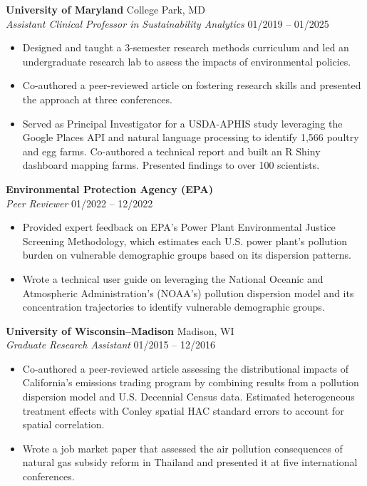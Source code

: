 \documentclass[11pt,letterpaper]{article}
\newcommand{\entry}[4]{%
  \textbf{#1} \hfill #2 \\
  \textit{#3} \hfill #4 \par\vspace{1pt}}
\begin{document}
\vspace{10pt}
\entry{University of Maryland}{College Park, MD}{Assistant Clinical Professor in Sustainability Analytics}{01/2019 -- 01/2025}
\begin{itemize}
  \item Designed and taught a 3-semester research methods curriculum and led an undergraduate research lab to assess the impacts of environmental policies. 
  \item Co-authored a peer-reviewed article on fostering research skills and presented the approach at three conferences.
  \item Served as Principal Investigator for a USDA-APHIS study leveraging the Google Places API and natural language processing to identify 1,566 poultry and egg farms. Co-authored a technical report and built an R Shiny dashboard mapping farms. Presented findings to over 100 scientists.
\end{itemize}

\vspace{10pt}
\entry{Environmental Protection Agency (EPA)}{}{Peer Reviewer}{01/2022 -- 12/2022}
\begin{itemize}
  \item Provided expert feedback on EPA's Power Plant Environmental Justice Screening Methodology, which estimates each U.S. power plant's pollution burden on vulnerable demographic groups based on its dispersion patterns.
  \item Wrote a technical user guide on leveraging the National Oceanic and Atmospheric Administration's (NOAA's) pollution dispersion model and its concentration trajectories to identify vulnerable demographic groups.
\end{itemize}

\pagebreak

\vspace{10pt}
\entry{University of Wisconsin--Madison}{Madison, WI}{Graduate Research Assistant}{01/2015 -- 12/2016}
\begin{itemize}
  \item Co-authored a peer-reviewed article assessing the distributional impacts of California's emissions trading program by combining results from a pollution dispersion model and U.S. Decennial Census data. Estimated heterogeneous treatment effects with Conley spatial HAC standard errors to account for spatial correlation.
  \item Wrote a job market paper that assessed the air pollution consequences of natural gas subsidy reform in Thailand and presented it at five international conferences.
\end{itemize}
\end{document}
